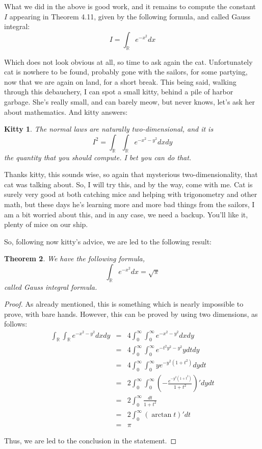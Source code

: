 \documentclass[12pt]{amsbook}
\newtheorem{theorem}{Theorem}[chapter]
\newtheorem{kitty}[theorem]{Kitty}
\begin{document}
What we did in the above is good work, and it remains to compute the constant $I$ appearing in Theorem 4.11, given by the following formula, and called Gauss integral:
$$I=\int_\mathbb Re^{-x^2}dx$$

Which does not look obvious at all, so time to ask again the cat. Unfortunately cat is nowhere to be found, probably gone with the sailors, for some partying, now that we are again on land, for a short break. This being said, walking through this debauchery, I can spot a small kitty, behind a pile of harbor garbage. She's really small, and can barely meow, but never knows, let's ask her about mathematics. And kitty answers:

\begin{kitty}
The normal laws are naturally two-dimensional, and it is
$$I^2=\int_\mathbb R\int_\mathbb Re^{-x^2-y^2}dxdy$$
the quantity that you should compute. I bet you can do that.
\end{kitty}

Thanks kitty, this sounds wise, so again that mysterious two-dimensionality, that cat was talking about. So, I will try this, and by the way, come with me. Cat is surely very good at both catching mice and helping with trigonometry and other math, but these days he's learning more and more bad things from the sailors, I am a bit worried about this, and in any case, we need a backup. You'll like it, plenty of mice on our ship.

\bigskip

So, following now kitty's advice, we are led to the following result:

\begin{theorem}
We have the following formula,
$$\int_\mathbb Re^{-x^2}dx=\sqrt{\pi}$$
called Gauss integral formula.
\end{theorem}

\begin{proof}
As already mentioned, this is something which is nearly impossible to prove, with bare hands. However, this can be proved by using two dimensions, as follows:
\begin{eqnarray*}
\int_\mathbb R\int_\mathbb Re^{-x^2-y^2}dxdy
&=&4\int_0^\infty\int_0^\infty e^{-x^2-y^2}dxdy\\
&=&4\int_0^\infty\int_0^\infty e^{-t^2y^2-y^2}ydtdy\\
&=&4\int_0^\infty\int_0^\infty ye^{-y^2(1+t^2)}dydt\\
&=&2\int_0^\infty\int_0^\infty\left(-\frac{e^{-y^2(1+t^2)}}{1+t^2}\right)'dydt\\
&=&2\int_0^\infty\frac{dt}{1+t^2}\\
&=&2\int_0^\infty(\arctan t)'dt\\
&=&\pi
\end{eqnarray*}

Thus, we are led to the conclusion in the statement.
\end{proof}
\end{document}

